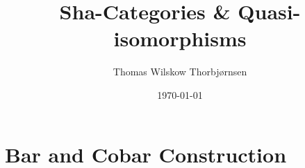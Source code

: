 \documentclass[american,titlepage]{ntnuthesis}
\title{Sha-Categories \& Quasi-isomorphisms}
\author{Thomas Wilskow Thorbjørnsen}
\date{\today}
\theoremstyle{plain}
\theoremstyle{definition}
\theoremstyle{remark}
\begin{document}
    

    \tableofcontents %

    \printglossary[type=\acronymtype] %
    \printglossary                    %

    \chapter{Bar and Cobar Construction}

        

    \chapter*{\bibname}
    \printbibliography[heading=none]



    \appendix
% 
\end{document}
